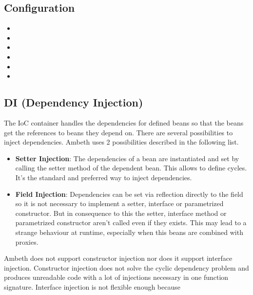 \subsection{Configuration}
\begin{itemize}
	\item {}
	\item {}
	\item {}
	\item {}
	\item {}
	\item {}
\end{itemize}

\subsection{DI (Dependency Injection)}

The IoC container handles the dependencies for defined beans so that the beans get the references to beans they depend on. There are several possibilities to inject dependencies. Ambeth uses 2 possibilities described in the following list. 

\begin{itemize}
	\item \textbf{Setter Injection}: The dependencies of a bean are instantiated and set by calling the setter method of the dependent bean. This allows to define cycles. It's the standard and preferred way to inject dependencies.
	\item \textbf{Field Injection}: Dependencies can be set via reflection directly to the field so it is not necessary to implement a setter, interface or parametrized constructor. But in consequence to this the setter, interface method or parametrized constructor aren't called even if they exists. This may lead to a strange behaviour at runtime, especially when this beans are combined with proxies.
\end{itemize}	

Ambeth does not support constructor injection nor does it support interface injection. Constructor injection does not solve the cyclic dependency problem and produces unreadable code with a lot of injections necessary in one function signature. Interface injection is not flexible enough because \TODO

